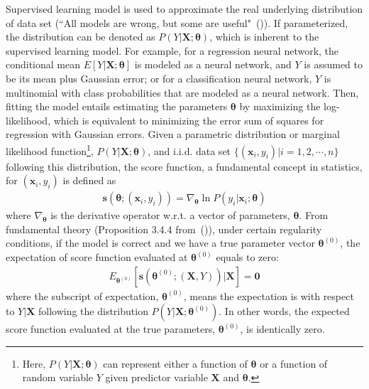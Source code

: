\documentclass[twoside,11pt]{article}
\begin{document}
Supervised learning model is used to approximate the real underlying distribution of data set (``All models are wrong, but some are useful"~(\cite{box1976science})). If parameterized, the distribution can be denoted as $P(Y|\bm{X};\bm{\theta})$, which is inherent to the supervised learning model. For example, for a regression neural network, the conditional mean $E[Y|\bm{X};\bm{\theta}]$ is modeled as a neural network, and $Y$ is assumed to be its mean plus Gaussian error; or for a classification neural network, $Y$ is multinomial with class probabilities that are modeled as a neural network. Then, fitting the model entails estimating the parameters $\bm{\theta}$ by maximizing the log-likelihood, which is equivalent to minimizing the error sum of squares for regression with Gaussian errors. Given a parametric distribution or {marginal} likelihood function\footnote{Here, $P(Y|\bm{X};\bm{\theta})$ can represent either a function of $\bm { \theta}$ or a function of random variable $Y$ given predictor variable $\bm {X}$ and $\bm { \theta}$.}, {$P(Y | \bm {X}; \bm{\theta})$}, and i.i.d. data set $\{(\bm {x}_i, y_i) | i = 1,2, \cdots, n\}$ following this distribution, the score function, a fundamental concept in statistics, for $ (\bm {x}_i, y_i)$ is defined as 
\begin{align}
\bm{s}(\bm { \theta}; (\bm {x}_i, y_i)) = \nabla _{\bm { \theta}} { \ln P(y_i | \bm {x}_i; \bm{\theta})}
\label{eqn:score_func}
\end{align}
where $\nabla _{\bm { \theta}}$ is the derivative operator w.r.t. a vector of parameters, $\bm {\theta}$. From fundamental theory (Proposition 3.4.4 from~(\cite{bickel2015mathematical})), under certain regularity conditions, if the model is correct and we have a true parameter vector {$\bm { \theta} ^{ (0)}$}, the expectation of score function evaluated at $\bm { \theta} ^{ (0)}$ equals to zero: 
\begin{align}
E_{\bm { \theta} ^{ (0)}}[\bm{s}(\bm { \theta}^{ (0)};(\bm {X}, Y))|\bm {X}] = \bm{0}
\label{eqn:score_exp_zero}
\end{align}
where the subscript of expectation, $\bm { \theta} ^{ (0)}$, means the expectation is with respect to $Y|\bm{X}$ following the distribution $P(Y|\bm{X};\bm{\theta}^{(0)})$. In other words, the expected score function evaluated at the true parameters, $\bm { \theta} ^{ (0)}$, is identically zero.
\end{document}

